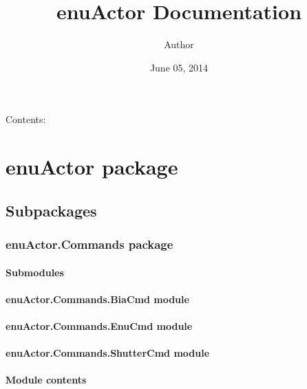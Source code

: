 \documentclass[letterpaper,10pt,english]{sphinxmanual}
\title{enuActor Documentation}
\date{June 05, 2014}
\author{Author}
\begin{document}
\maketitle
\tableofcontents
{}\label{index::doc}


Contents:


\chapter{enuActor package}
\label{enuActor::doc}\label{enuActor:welcome-to-enuactor-s-documentation}\label{enuActor:enuactor-package}

\section{Subpackages}
\label{enuActor:subpackages}

\subsection{enuActor.Commands package}
\label{enuActor.Commands::doc}\label{enuActor.Commands:enuactor-commands-package}

\subsubsection{Submodules}
\label{enuActor.Commands:submodules}

\subsubsection{enuActor.Commands.BiaCmd module}
\label{enuActor.Commands:enuactor-commands-biacmd-module}

\subsubsection{enuActor.Commands.EnuCmd module}
\label{enuActor.Commands:enuactor-commands-enucmd-module}

\subsubsection{enuActor.Commands.ShutterCmd module}
\label{enuActor.Commands:enuactor-commands-shuttercmd-module}

\subsubsection{Module contents}
\label{enuActor.Commands:module-contents}\label{enuActor.Commands:module-enuActor.Commands}
\end{document}
